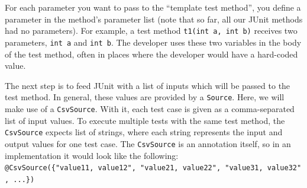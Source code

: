 For each parameter you want to pass to the ``template test method'', you
define a parameter in the method's parameter list (note that so far, all
our JUnit methods had no parameters). For example, a test method
\texttt{t1(int\ a,\ int\ b)} receives two parameters, \texttt{int\ a}
and \texttt{int\ b}. The developer uses these two variables in the body
of the test method, often in places where the developer would have a
hard-coded value.

The next step is to feed JUnit with a list of inputs which will be
passed to the test method. In general, these values are provided by a
\texttt{Source}. Here, we will make use of a \texttt{CsvSource}. With
it, each test case is given as a comma-separated list of input values.
To execute multiple tests with the same test method, the
\texttt{CsvSource} expects list of strings, where each string represents
the input and output values for one test case. The \texttt{CsvSource} is
an annotation itself, so in an implementation it would look like the
following:
\texttt{@CsvSource(\{"value11,\ value12",\ "value21,\ value22",\ "value31,\ value32",\ ...\})}

\begin{Shaded}
\begin{Highlighting}[]
\NormalTok{)}
    \NormalTok{(\{}
      \NormalTok{, }\NormalTok{, }\NormalTok{, }\NormalTok{,}
      \NormalTok{, }\NormalTok{, }\NormalTok{, }\NormalTok{,}
      \NormalTok{, }\NormalTok{, }\NormalTok{, }\NormalTok{,}
      \NormalTok{, }\NormalTok{, }\NormalTok{, }\NormalTok{,}
      \NormalTok{, }\NormalTok{, }\NormalTok{, }
\NormalTok{    \})}
     \NormalTok{(}
         
\NormalTok{    \}}
\end{Highlighting}
\end{Shaded}

